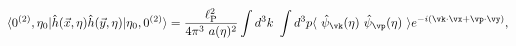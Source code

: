 \begin{equation}
\langle 0^{(2)},\eta_0| \hat{h}(\vec{x},\eta) \hat{h}(\vec{y},\eta) | \eta_{0},0^{(2)}\rangle =
 \frac{ \ell_{\rm P}^2}{4 \pi^3~a(\eta)^2} \int d^3 k~\int d^3 p 
\langle ~\hat{\psi}_{\vk}(\eta)~ \hat{\psi}_{\vp}(\eta)~ \rangle e^{ - i (\vk\cdot\vx + \vp\cdot\vy)}
,\label{twopo}
\end{equation}

